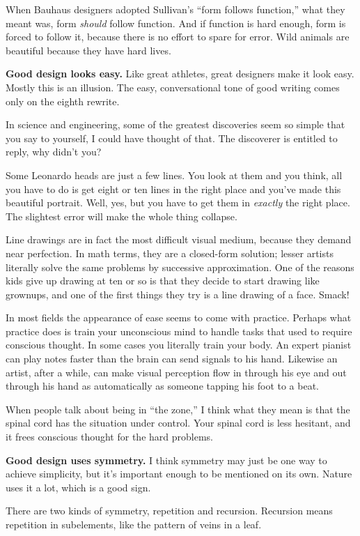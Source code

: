 \documentclass[12pt]{book}
\begin{document}
When Bauhaus designers adopted Sullivan's ``form follows function,''
what they meant was, form \emph{should} follow function. And if function
is hard enough, form is forced to follow it, because there is no effort
to spare for error. Wild animals are beautiful because they have hard
lives.

\textbf{Good design looks easy.} Like great athletes, great designers
make it look easy. Mostly this is an illusion. The easy, conversational
tone of good writing comes only on the eighth rewrite.

In science and engineering, some of the greatest discoveries seem so
simple that you say to yourself, I could have thought of that. The
discoverer is entitled to reply, why didn't you?

Some Leonardo heads are just a few lines. You look at them and you
think, all you have to do is get eight or ten lines in the right place
and you've made this beautiful portrait. Well, yes, but you have to get
them in \emph{exactly} the right place. The slightest error will make
the whole thing collapse.

Line drawings are in fact the most difficult visual medium, because they
demand near perfection. In math terms, they are a closed-form solution;
lesser artists literally solve the same problems by successive
approximation. One of the reasons kids give up drawing at ten or so is
that they decide to start drawing like grownups, and one of the first
things they try is a line drawing of a face. Smack!

In most fields the appearance of ease seems to come with practice.
Perhaps what practice does is train your unconscious mind to handle
tasks that used to require conscious thought. In some cases you
literally train your body. An expert pianist can play notes faster than
the brain can send signals to his hand. Likewise an artist, after a
while, can make visual perception flow in through his eye and out
through his hand as automatically as someone tapping his foot to a beat.

When people talk about being in ``the zone,'' I think what they mean is
that the spinal cord has the situation under control. Your spinal cord
is less hesitant, and it frees conscious thought for the hard problems.

\textbf{Good design uses symmetry.} I think symmetry may just be one way
to achieve simplicity, but it's important enough to be mentioned on its
own. Nature uses it a lot, which is a good sign.

There are two kinds of symmetry, repetition and recursion. Recursion
means repetition in subelements, like the pattern of veins in a leaf.
\end{document}
